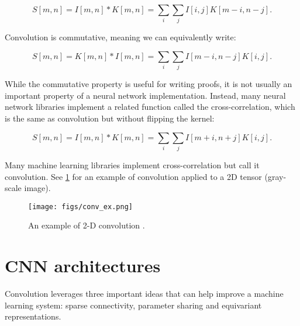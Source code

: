 \begin{equation}
  \label{2Dconvolution}
  S[m, n] = I[m, n] \ast K[m, n] = \sum_{i}\sum_{j} I[i, j] K[m - i, n - j].
\end{equation}

Convolution is commutative, meaning we can equivalently write:

\begin{equation}
  \label{2Dflipped}
  S[m, n] = K[m, n] \ast I[m, n] = \sum_{i}\sum_{j} I[m - i, n -j] K[i, j].
\end{equation}

While the commutative property is useful for writing proofs, it is not usually an important property of a neural
network implementation. Instead, many neural network libraries implement a
related function called the cross-correlation, which is the same as convolution
but without flipping the kernel:

\begin{equation}
  \label{cross-correlation}
  S[m, n] = I[m, n] \ast K[m, n] = \sum_{i}\sum_{j} I[m + i, n + j] K[i, j].
\end{equation}

Many machine learning libraries implement cross-correlation but call it convolution. See \cref{fig:conv-ex} for an example of convolution
applied to a 2D tensor (gray-scale image).


\begin{figure}[!htbp]
  \centering
  \texttt{[image: figs/conv\_ex.png]}
  \caption{An example of 2-D convolution \cite{Ian16}.}\label{fig:conv-ex}
\end{figure}

\section{CNN architectures}

Convolution leverages three important ideas that can help improve a machine learning system: sparse connectivity, parameter sharing and
equivariant representations.

